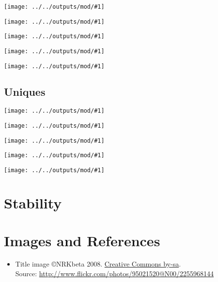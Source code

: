 \documentclass[longdoc,nochapterpage,colorbacktitle,accentcolor=tud1b,11pt,paper=a4]{tudreport}
\newcounter{dummy} %
\newcommand{\imga}[2]{
  \texttt{[image: ../../outputs/mod/\#1]}
}
\begin{document}
	  \imga{loadBal_downBWConsPerHost_10000_300d}{.85}

	  \imga{loadBal_downBWPerHost_10000_300d}{.85}

	  \imga{loadBal_staleBWPerHost_10000_300d}{.85}

	  \imga{loadBal_upBWConsPerHost_10000_300d}{.85}

	  \imga{loadBal_upBWPerHost_10000_300d}{.85}

	  \section{Uniques}

	  \imga{loadBal_downBWConsPerHost_10000_voip}{.85}

	  \imga{loadBal_downBWPerHost_10000_voip}{.85}

 	  \imga{loadBal_staleBWPerHost_10000_voip}{.85}

	  \imga{loadBal_upBWConsPerHost_10000_voip}{.85}

	  \imga{loadBal_upBWPerHost_10000_voip}{.85}

	\chapter{Stability}

	\chapter{Images and References}
	\begin{itemize}
	 \item Title image \copyright NRKbeta 2008. \href{http://creativecommons.org/licenses/by-sa/2.0/deed.de}{Creative Commons by-sa}. \\ Source: \href{http://www.flickr.com/photos/95021520@N00/2255968144}{http://www.flickr.com/photos/95021520@N00/2255968144}
	\end{itemize}

	
\end{document}
